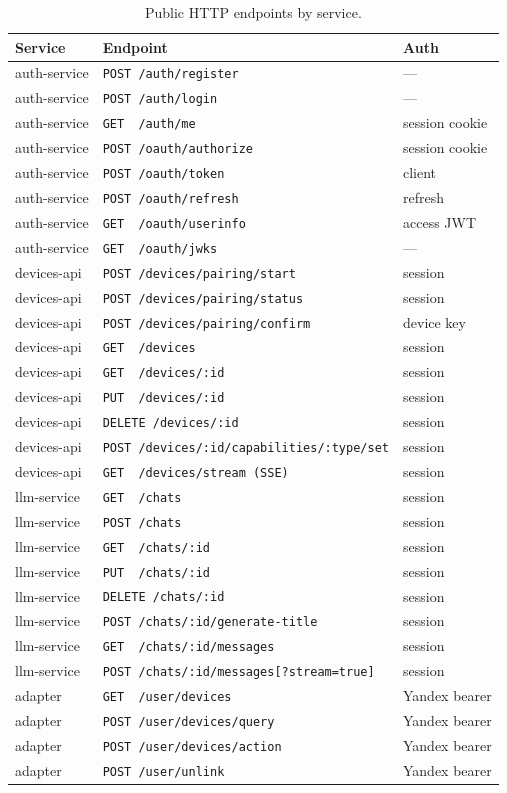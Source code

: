 \documentclass[a4paper,12pt]{article}
\begin{document}
\begin{table}[h]
\centering
\small
\begin{tabularx}{\textwidth}{lXl}
\toprule
\textbf{Service} & \textbf{Endpoint} & \textbf{Auth} \\
\midrule
auth-service & \verb|POST /auth/register| & --- \\
auth-service & \verb|POST /auth/login| & --- \\
auth-service & \verb|GET  /auth/me| & session cookie \\
auth-service & \verb|POST /oauth/authorize| & session cookie \\
auth-service & \verb|POST /oauth/token| & client \\
auth-service & \verb|POST /oauth/refresh| & refresh \\
auth-service & \verb|GET  /oauth/userinfo| & access JWT \\
auth-service & \verb|GET  /oauth/jwks| & --- \\
\midrule
devices-api & \verb|POST /devices/pairing/start| & session \\
devices-api & \verb|POST /devices/pairing/status| & session \\
devices-api & \verb|POST /devices/pairing/confirm| & device key \\
devices-api & \verb|GET  /devices| & session \\
devices-api & \verb|GET  /devices/:id| & session \\
devices-api & \verb|PUT  /devices/:id| & session \\
devices-api & \verb|DELETE /devices/:id| & session \\
devices-api & \verb|POST /devices/:id/capabilities/:type/set| & session \\
devices-api & \verb|GET  /devices/stream (SSE)| & session \\
\midrule
llm-service & \verb|GET  /chats| & session \\
llm-service & \verb|POST /chats| & session \\
llm-service & \verb|GET  /chats/:id| & session \\
llm-service & \verb|PUT  /chats/:id| & session \\
llm-service & \verb|DELETE /chats/:id| & session \\
llm-service & \verb|POST /chats/:id/generate-title| & session \\
llm-service & \verb|GET  /chats/:id/messages| & session \\
llm-service & \verb|POST /chats/:id/messages[?stream=true]| & session \\
\midrule
adapter & \verb|GET  /user/devices| & Yandex bearer \\
adapter & \verb|POST /user/devices/query| & Yandex bearer \\
adapter & \verb|POST /user/devices/action| & Yandex bearer \\
adapter & \verb|POST /user/unlink| & Yandex bearer \\
\bottomrule
\end{tabularx}
\caption{Public HTTP endpoints by service.}
\label{tab:api}
\end{table}
\end{document}
